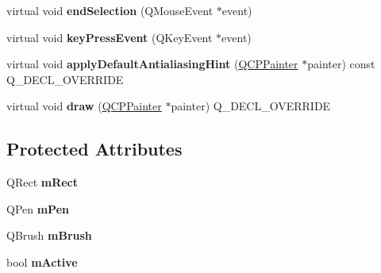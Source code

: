 \begin{DoxyCompactItemize}
\item 
virtual void {\bfseries end\+Selection} (Q\+Mouse\+Event $\ast$event)\hypertarget{class_q_c_p_selection_rect_a24423c70a6443a99fe52e59352e8ef4e}{}\label{class_q_c_p_selection_rect_a24423c70a6443a99fe52e59352e8ef4e}

\item 
virtual void {\bfseries key\+Press\+Event} (Q\+Key\+Event $\ast$event)\hypertarget{class_q_c_p_selection_rect_a104510526464f94a936e84b33f86b629}{}\label{class_q_c_p_selection_rect_a104510526464f94a936e84b33f86b629}

\item 
virtual void {\bfseries apply\+Default\+Antialiasing\+Hint} (\hyperlink{class_q_c_p_painter}{Q\+C\+P\+Painter} $\ast$painter) const Q\+\_\+\+D\+E\+C\+L\+\_\+\+O\+V\+E\+R\+R\+I\+DE\hypertarget{class_q_c_p_selection_rect_a93428a903587c0c2620c92d7f59352af}{}\label{class_q_c_p_selection_rect_a93428a903587c0c2620c92d7f59352af}

\item 
virtual void {\bfseries draw} (\hyperlink{class_q_c_p_painter}{Q\+C\+P\+Painter} $\ast$painter) Q\+\_\+\+D\+E\+C\+L\+\_\+\+O\+V\+E\+R\+R\+I\+DE\hypertarget{class_q_c_p_selection_rect_a60890b3483c8644bba63445cc37fd16d}{}\label{class_q_c_p_selection_rect_a60890b3483c8644bba63445cc37fd16d}

\end{DoxyCompactItemize}
\subsection*{Protected Attributes}
\begin{DoxyCompactItemize}
\item 
Q\+Rect {\bfseries m\+Rect}\hypertarget{class_q_c_p_selection_rect_a45a2600ef19c8f7b5ec6134beab036cf}{}\label{class_q_c_p_selection_rect_a45a2600ef19c8f7b5ec6134beab036cf}

\item 
Q\+Pen {\bfseries m\+Pen}\hypertarget{class_q_c_p_selection_rect_ae255dec12cd531071115bd667f0fd815}{}\label{class_q_c_p_selection_rect_ae255dec12cd531071115bd667f0fd815}

\item 
Q\+Brush {\bfseries m\+Brush}\hypertarget{class_q_c_p_selection_rect_a1bda3f02c2e4da58c856d19695028cbe}{}\label{class_q_c_p_selection_rect_a1bda3f02c2e4da58c856d19695028cbe}

\item 
bool {\bfseries m\+Active}\hypertarget{class_q_c_p_selection_rect_a1c167356b0bc59e62691bff8c90f5851}{}\label{class_q_c_p_selection_rect_a1c167356b0bc59e62691bff8c90f5851}

\end{DoxyCompactItemize}
